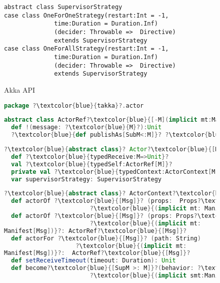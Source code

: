 \begin{figure}[!h]
    \begin{lstlisting}    
abstract class SupervisorStrategy
case class OneForOneStrategy(restart:Int = -1, 
              time:Duration = Duration.Inf)
              (decider: Throwable =>  Directive) 
              extends SupervisorStrategy
case class OneForAllStrategy(restart:Int = -1, 
              time:Duration = Duration.Inf)
              (decider: Throwable =>  Directive) 
              extends SupervisorStrategy
    \end{lstlisting}
    \vspace{-15pt }
        
    \caption{Akka API}
    \vspace{-20pt }
\end{figure}


\begin{figure}[!h]
\label{takka_api}
    \begin{lstlisting}[language=scala, escapechar=?]
package ?\textcolor{blue}{takka}?.actor   
\end{lstlisting}

    \begin{lstlisting}[language=scala, escapechar=?]
abstract class ActorRef?\textcolor{blue}{[-M](implicit mt:Manifest[M])}?
  def !(message: ?\textcolor{blue}{M}?):Unit
  ?\textcolor{blue}{def publishAs[SubM<:M]}? ?\textcolor{blue}{(implicit smt:Manifest[SubM]):ActorRef[SubM]}?
    \end{lstlisting}
    
    \begin{lstlisting}[language=scala, escapechar=?]
?\textcolor{blue}{abstract class}? Actor?\textcolor{blue}{[M:Manifest]}?  extends  akka.actor.Actor
  def ?\textcolor{blue}{typedReceive:M=>Unit}?
  val ?\textcolor{blue}{typedSelf:ActorRef[M]}?
  private val ?\textcolor{blue}{typedContext:ActorContext[M]}?
  var supervisorStrategy: SupervisorStrategy
\end{lstlisting}

      \begin{lstlisting}[language=scala, escapechar=?]
?\textcolor{blue}{abstract class}? ActorContext?\textcolor{blue}{[M:Manifest]}?
  def actorOf ?\textcolor{blue}{[Msg]}? (props:  Props?\textcolor{blue}{[Msg])}?
  						?\textcolor{blue}{(implicit mt: Manifest[Msg]}?): ActorRef?\textcolor{blue}{[Msg]}?
  def actorOf ?\textcolor{blue}{[Msg]}? (props: Props?\textcolor{blue}{[Msg]}?, name: String)
  						?\textcolor{blue}{(implicit mt: 
Manifest[Msg])}?: ActorRef?\textcolor{blue}{[Msg]}?
  def actorFor ?\textcolor{blue}{[Msg]}? (path: String)
       				?\textcolor{blue}{(implicit mt: 
Manifest[Msg])}?:  ActorRef?\textcolor{blue}{[Msg]}?
  def setReceiveTimeout(timeout: Duration): Unit
  def become?\textcolor{blue}{[SupM >: M]}?(behavior: ?\textcolor{blue}{SupM=>Unit}?)
						?\textcolor{blue}{(implicit smt:Manifest[SupM]):ActorRef[SupM]}?


\end{lstlisting}
\end{figure}
